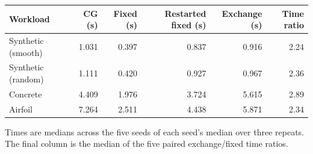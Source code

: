 \begin{center}
\small\setlength{\tabcolsep}{4pt}
\begin{tabular}{lrrrrr}
\hline
Workload & CG (s) & Fixed (s) & Restarted fixed (s) & Exchange (s) & Time ratio \\
\hline
Synthetic (smooth) & 1.031 & 0.397 & 0.837 & 0.916 & 2.24 \\
Synthetic (random) & 1.111 & 0.420 & 0.927 & 0.967 & 2.36 \\
Concrete & 4.409 & 1.976 & 3.724 & 5.615 & 2.89 \\
Airfoil & 7.264 & 2.511 & 4.438 & 5.871 & 2.34 \\
\hline
\end{tabular}
\end{center}
Times are medians across the five seeds of each seed's median over three repeats.
The final column is the median of the five paired exchange/fixed time ratios.
